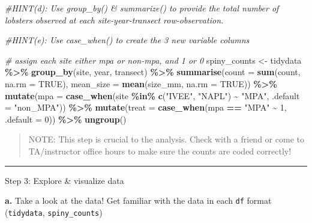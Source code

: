 \documentclass[
]{article}
\newenvironment{Shaded}{\begin{snugshade}}{\end{snugshade}}
\newcommand{\AttributeTok}[1]{\textcolor[rgb]{0.13,0.29,0.53}{#1}}
\newcommand{\CommentTok}[1]{\textcolor[rgb]{0.56,0.35,0.01}{\textit{#1}}}
\newcommand{\ConstantTok}[1]{\textcolor[rgb]{0.56,0.35,0.01}{#1}}
\newcommand{\DecValTok}[1]{\textcolor[rgb]{0.00,0.00,0.81}{#1}}
\newcommand{\FunctionTok}[1]{\textcolor[rgb]{0.13,0.29,0.53}{\textbf{#1}}}
\newcommand{\NormalTok}[1]{#1}
\newcommand{\OtherTok}[1]{\textcolor[rgb]{0.56,0.35,0.01}{#1}}
\newcommand{\SpecialCharTok}[1]{\textcolor[rgb]{0.81,0.36,0.00}{\textbf{#1}}}
\newcommand{\StringTok}[1]{\textcolor[rgb]{0.31,0.60,0.02}{#1}}
\begin{document}
\begin{Shaded}
\begin{Highlighting}[]
\CommentTok{\#HINT(d): Use \textasciigrave{}group\_by()\textasciigrave{} \& \textasciigrave{}summarize()\textasciigrave{} to provide the total number of lobsters observed at each site{-}year{-}transect row{-}observation. }

\CommentTok{\#HINT(e): Use \textasciigrave{}case\_when()\textasciigrave{} to create the 3 new variable columns}

\CommentTok{\# assign each site either mpa or non{-}mpa, and 1 or 0}
\NormalTok{spiny\_counts }\OtherTok{\textless{}{-}}\NormalTok{ tidydata }\SpecialCharTok{\%\textgreater{}\%} 
    \FunctionTok{group\_by}\NormalTok{(site, year, transect) }\SpecialCharTok{\%\textgreater{}\%} 
    \FunctionTok{summarise}\NormalTok{(}\AttributeTok{count =} \FunctionTok{sum}\NormalTok{(count, }\AttributeTok{na.rm =} \ConstantTok{TRUE}\NormalTok{), }\AttributeTok{mean\_size =} \FunctionTok{mean}\NormalTok{(size\_mm, }\AttributeTok{na.rm =} \ConstantTok{TRUE}\NormalTok{)) }\SpecialCharTok{\%\textgreater{}\%} 
    \FunctionTok{mutate}\NormalTok{(}\AttributeTok{mpa =} \FunctionTok{case\_when}\NormalTok{(site }\SpecialCharTok{\%in\%} \FunctionTok{c}\NormalTok{(}\StringTok{"IVEE"}\NormalTok{, }\StringTok{"NAPL"}\NormalTok{) }\SpecialCharTok{\textasciitilde{}} \StringTok{"MPA"}\NormalTok{,}
                           \AttributeTok{.default =} \StringTok{"non\_MPA"}\NormalTok{)) }\SpecialCharTok{\%\textgreater{}\%} 
    \FunctionTok{mutate}\NormalTok{(}\AttributeTok{treat =} \FunctionTok{case\_when}\NormalTok{(mpa }\SpecialCharTok{==} \StringTok{"MPA"} \SpecialCharTok{\textasciitilde{}} \DecValTok{1}\NormalTok{,}
                             \AttributeTok{.default =} \DecValTok{0}\NormalTok{)) }\SpecialCharTok{\%\textgreater{}\%} 
    \FunctionTok{ungroup}\NormalTok{()}
\end{Highlighting}
\end{Shaded}

\begin{quote}
NOTE: This step is crucial to the analysis. Check with a friend or come
to TA/instructor office hours to make sure the counts are coded
correctly!
\end{quote}

\begin{center}\rule{0.5\linewidth}{0.5pt}\end{center}

Step 3: Explore \& visualize data

\textbf{a.} Take a look at the data! Get familiar with the data in each
\texttt{df} format (\texttt{tidydata}, \texttt{spiny\_counts})
\end{document}
